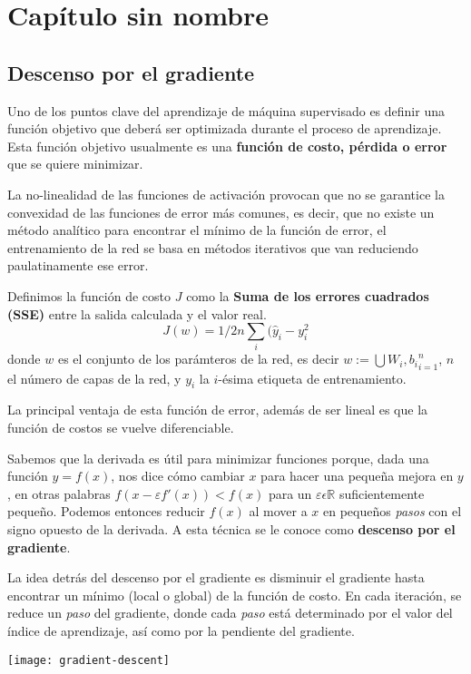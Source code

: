 \section{Capítulo sin nombre}
\subsection{Descenso por el gradiente}
Uno de los puntos clave del aprendizaje de máquina supervisado es
definir una función objetivo que deberá ser optimizada durante el
proceso de aprendizaje. Esta función objetivo usualmente es una
\textbf{función de costo, pérdida o error} que se quiere minimizar.

La no-linealidad de las funciones de activación provocan que no se garantice la convexidad
de las funciones de error más comunes, es decir, que no existe un método analítico para
encontrar el mínimo de la función de error, el entrenamiento de la red se basa en
métodos iterativos que van reduciendo paulatinamente ese error. 

Definimos la función de costo $J$ como la \textbf{Suma de
  los errores cuadrados (SSE)} entre la salida calculada y el valor
real.
\begin{equation}
  J(w)=1/2n \sum_i (\hat{y}_i - y_i^2
\end{equation}
donde $w$ es el conjunto de los parámteros de la red, es decir
$w := \bigcup{W_i, b_i}_{i=1}^{n}$, $n$ el número de capas de la red, y $y_i$
la $i$-ésima etiqueta de entrenamiento.

La principal ventaja de esta función de error, además de ser lineal
es que la función de costos se vuelve diferenciable.

Sabemos que la derivada es útil para minimizar funciones porque, dada una función
$y = f(x)$, nos dice cómo cambiar $x$ para hacer una pequeña mejora en $y$, en
otras palabras $f(x-\varepsilon f'(x)) < f(x)$ para un $\varepsilon \epsilon \mathbb{R}$
suficientemente pequeño. Podemos entonces reducir $f(x)$ al mover a $x$ en pequeños
\textit{pasos} con el signo opuesto de la derivada. A esta técnica se le conoce como
\textbf{descenso por el gradiente}.

La idea detrás del descenso por el gradiente es disminuir el gradiente hasta encontrar
un mínimo (local o global) de la función de costo. En cada iteración, se reduce
un \textit{paso} del gradiente, donde cada \textit{paso} está determinado por
el valor del índice de aprendizaje, así como por la pendiente del gradiente.

\texttt{[image: gradient-descent]}

